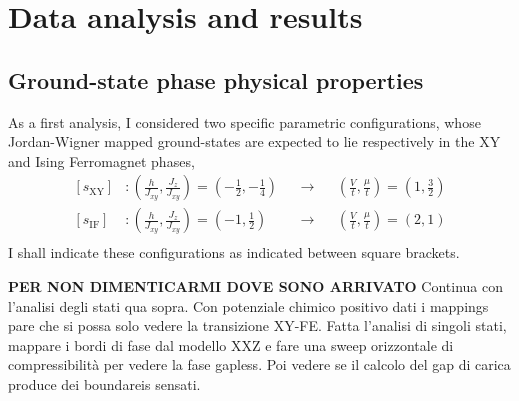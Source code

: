 \clearpage
\section{Data analysis and results}

\todo

\subsection{Ground-state phase physical properties}

As a first analysis, I considered two specific parametric configurations, whose Jordan-Wigner mapped ground-states are expected to lie respectively in the $\mathrm{XY}$ and Ising Ferromagnet phases,
\[
	\begin{aligned}
		[s_\mathrm{XY}] &\colon \left(
			\frac{h}{J_{xy}}, \frac{J_{z}}{J_{xy}}
		\right) = \left(
			-\frac{1}{2}, - \frac{1}{4}
		\right) &&\to &&\left(
			\frac{V}{t}, \frac{\mu}{t}
		\right) = \left(
			1, \frac{3}{2}
		\right) \\
		[s_\mathrm{IF}] &\colon \left(
			\frac{h}{J_{xy}}, \frac{J_{z}}{J_{xy}}
		\right) = \left(
			-1, \frac{1}{2}
		\right) &&\to &&\left(
			\frac{V}{t}, \frac{\mu}{t}
		\right) = \left(
			2, 1
		\right) \\
	\end{aligned}
\]
I shall indicate these configurations as indicated between square brackets.

{\color{red}\textbf{PER NON DIMENTICARMI DOVE SONO ARRIVATO} Continua con l'analisi degli stati qua sopra. Con potenziale chimico positivo dati i mappings pare che si possa solo vedere la transizione XY-FE. Fatta l'analisi di singoli stati, mappare i bordi di fase dal modello XXZ e fare una sweep orizzontale di compressibilità per vedere la fase gapless. Poi vedere se il calcolo del gap di carica produce dei boundareis sensati.}

\todo